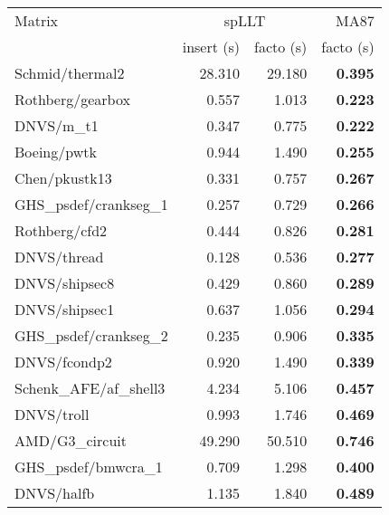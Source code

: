 \begin{tabular}{l|rr|r}
  \hline
  Matrix                                 & \multicolumn{2}{c}{spLLT} & MA87                   \\
  \cline{2-4}
                                         & insert (s)                & facto (s) & facto (s)  \\
  \hline
                         Schmid/thermal2 & 28.310                    & 29.180    & \bf 0.395  \\
                        Rothberg/gearbox & 0.557                     & 1.013     & \bf 0.223  \\
                              DNVS/m\_t1 & 0.347                     & 0.775     & \bf 0.222  \\
                             Boeing/pwtk & 0.944                     & 1.490     & \bf 0.255  \\
                           Chen/pkustk13 & 0.331                     & 0.757     & \bf 0.267  \\
                  GHS\_psdef/crankseg\_1 & 0.257                     & 0.729     & \bf 0.266  \\
                           Rothberg/cfd2 & 0.444                     & 0.826     & \bf 0.281  \\
                             DNVS/thread & 0.128                     & 0.536     & \bf 0.277  \\
                           DNVS/shipsec8 & 0.429                     & 0.860     & \bf 0.289  \\
                           DNVS/shipsec1 & 0.637                     & 1.056     & \bf 0.294  \\
                  GHS\_psdef/crankseg\_2 & 0.235                     & 0.906     & \bf 0.335  \\
                            DNVS/fcondp2 & 0.920                     & 1.490     & \bf 0.339  \\
                  Schenk\_AFE/af\_shell3 & 4.234                     & 5.106     & \bf 0.457  \\
                              DNVS/troll & 0.993                     & 1.746     & \bf 0.469  \\
                         AMD/G3\_circuit & 49.290                    & 50.510    & \bf 0.746  \\
                    GHS\_psdef/bmwcra\_1 & 0.709                     & 1.298     & \bf 0.400  \\
                              DNVS/halfb & 1.135                     & 1.840     & \bf 0.489  \\

\end{tabular}
